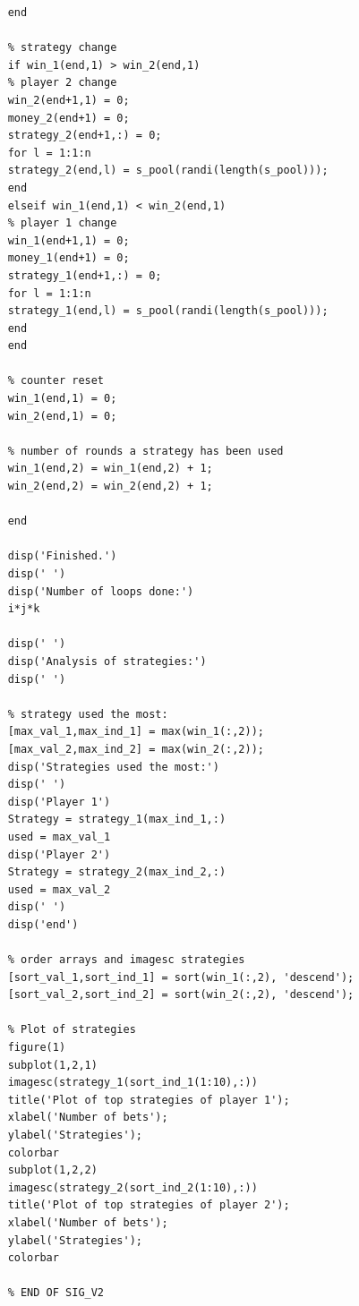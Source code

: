 \documentclass[11pt]{article}
\begin{document}
\begin{lstlisting}
	end
	
	% strategy change
	if win_1(end,1) > win_2(end,1)
	% player 2 change
	win_2(end+1,1) = 0;
	money_2(end+1) = 0;
	strategy_2(end+1,:) = 0;
	for l = 1:1:n
	strategy_2(end,l) = s_pool(randi(length(s_pool)));
	end
	elseif win_1(end,1) < win_2(end,1)
	% player 1 change
	win_1(end+1,1) = 0;
	money_1(end+1) = 0;
	strategy_1(end+1,:) = 0;
	for l = 1:1:n
	strategy_1(end,l) = s_pool(randi(length(s_pool)));
	end
	end
	
	% counter reset
	win_1(end,1) = 0;
	win_2(end,1) = 0;
	
	% number of rounds a strategy has been used
	win_1(end,2) = win_1(end,2) + 1;
	win_2(end,2) = win_2(end,2) + 1;
	
	end
	
	disp('Finished.')
	disp(' ')
	disp('Number of loops done:')
	i*j*k
	
	disp(' ')
	disp('Analysis of strategies:')
	disp(' ')
	
	% strategy used the most:
	[max_val_1,max_ind_1] = max(win_1(:,2));
	[max_val_2,max_ind_2] = max(win_2(:,2));
	disp('Strategies used the most:')
	disp(' ')
	disp('Player 1')
	Strategy = strategy_1(max_ind_1,:)
	used = max_val_1
	disp('Player 2')
	Strategy = strategy_2(max_ind_2,:)
	used = max_val_2
	disp(' ')
	disp('end')
	
	% order arrays and imagesc strategies
	[sort_val_1,sort_ind_1] = sort(win_1(:,2), 'descend');
	[sort_val_2,sort_ind_2] = sort(win_2(:,2), 'descend');
	
	% Plot of strategies
	figure(1)
	subplot(1,2,1)
	imagesc(strategy_1(sort_ind_1(1:10),:))
	title('Plot of top strategies of player 1');
	xlabel('Number of bets');
	ylabel('Strategies');
	colorbar
	subplot(1,2,2)
	imagesc(strategy_2(sort_ind_2(1:10),:))
	title('Plot of top strategies of player 2');
	xlabel('Number of bets');
	ylabel('Strategies');
	colorbar
	
	% END OF SIG_V2
\end{lstlisting}
\vspace{10mm}
\end{document}

